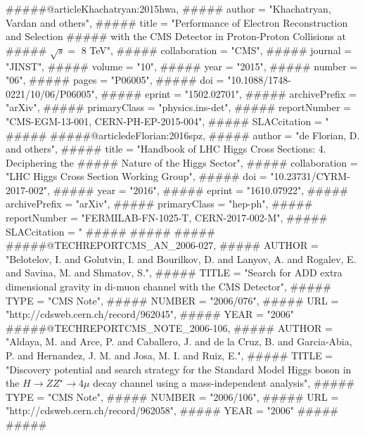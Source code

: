 #####@article{Khachatryan:2015hwa,
#####      author         = "Khachatryan, Vardan and others",
#####      title          = "{Performance of Electron Reconstruction and Selection
#####                        with the CMS Detector in Proton-Proton Collisions at
#####                        $\sqrt{s} =$ 8  TeV}",
#####      collaboration  = "CMS",
#####      journal        = "JINST",
#####      volume         = "10",
#####      year           = "2015",
#####      number         = "06",
#####      pages          = "P06005",
#####      doi            = "10.1088/1748-0221/10/06/P06005",
#####      eprint         = "1502.02701",
#####      archivePrefix  = "arXiv",
#####      primaryClass   = "physics.ins-det",
#####      reportNumber   = "CMS-EGM-13-001, CERN-PH-EP-2015-004",
#####      SLACcitation   = "%
#####}
#####@article{deFlorian:2016spz,
#####      author         = "de Florian, D. and others",
#####      title          = "{Handbook of LHC Higgs Cross Sections: 4. Deciphering the
#####                        Nature of the Higgs Sector}",
#####      collaboration  = "LHC Higgs Cross Section Working Group",
#####      doi            = "10.23731/CYRM-2017-002",
#####      year           = "2016",
#####      eprint         = "1610.07922",
#####      archivePrefix  = "arXiv",
#####      primaryClass   = "hep-ph",
#####      reportNumber   = "FERMILAB-FN-1025-T, CERN-2017-002-M",
#####      SLACcitation   = "%
#####}
#####%
#####%
#####@TECHREPORT{CMS_AN_2006-027,
#####     AUTHOR       = "Belotelov, I. and Golutvin, I. and Bourilkov, D. and Lanyov, A. and Rogalev, E. and Savina, M. and Shmatov, S.",
#####     TITLE        = "Search for {ADD} extra dimensional gravity in di-muon channel with the {CMS} Detector",
#####     TYPE      = "CMS Note",
#####     NUMBER       = "2006/076",
#####     URL          = "http://cdsweb.cern.ch/record/962045",
#####     YEAR         = "2006"}
#####@TECHREPORT{CMS_NOTE_2006-106,
#####     AUTHOR       = "Aldaya, M. and Arce, P. and Caballero, J. and de la Cruz, B. and Garcia-Abia, P. and Hernandez, J. M. and Josa, M. I. and Ruiz, E.",
#####     TITLE        = "Discovery potential and search strategy for the Standard Model {H}iggs boson in the {$H\to ZZ^\star\to 4\mu$} decay channel using a mass-independent analysis",
#####     TYPE      = "CMS Note",
#####     NUMBER       = "2006/106",
#####     URL          = "http://cdsweb.cern.ch/record/962058",
#####     YEAR         = "2006"}
#####%
#####%
